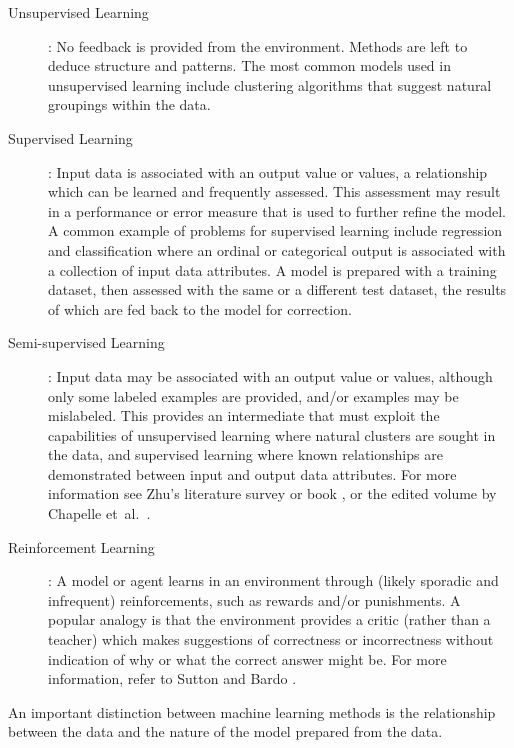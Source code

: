 \begin{description}
	\item[Unsupervised Learning]: No feedback is provided from the environment. Methods are left to deduce structure and patterns. The most common models used in unsupervised learning include clustering algorithms that suggest natural groupings within the data.
	
	\item[Supervised Learning]: Input data is associated with an output value or values, a relationship which can be learned and frequently assessed. This assessment may result in a performance or error measure that is used to further refine the model. A common example of problems for supervised learning include regression and classification where an ordinal or categorical output is associated with a collection of input data attributes. A model is prepared with a training dataset, then assessed with the same or a different test dataset, the results of which are fed back to the model for correction.
	
	\item[Semi-supervised Learning]: Input data may be associated with an output value or values, although only some labeled examples are provided, and/or examples may be mislabeled. This provides an intermediate that must exploit the capabilities of unsupervised learning where natural clusters are sought in the data, and supervised learning where known relationships are demonstrated between input and output data attributes. For more information see Zhu's literature survey \cite{Zhu2008} or book \cite{Zhu2009}, or the edited volume by Chapelle et~al.\ \cite{Chapelle2010}.
	
	\item[Reinforcement Learning]: A model or agent learns in an environment through (likely sporadic and infrequent) reinforcements, such as rewards and/or punishments. A popular analogy is that the environment provides a critic (rather than a teacher) which makes suggestions of correctness or incorrectness without indication of why or what the correct answer might be. For more information, refer to Sutton and Bardo \cite{Sutton1998}.
\end{description}

An important distinction between machine learning methods is the relationship between the data and the nature of the model prepared from the data.

